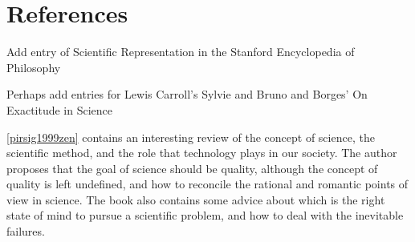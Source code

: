 %
%

\section*{References}

{\color{red} Add entry of Scientific Representation in the Stanford Encyclopedia of Philosophy}

{\color{red} Perhaps add entries for Lewis Carroll's Sylvie and Bruno and Borges' On Exactitude in Science}

\ref{pirsig1999zen} contains an interesting review of the concept of science, the scientific method, and the role that technology plays in our society. The author proposes that the goal of science should be quality, although the concept of quality is left undefined, and how to reconcile the rational and romantic points of view in science. The book also contains some advice about which is the right state of mind to pursue a scientific problem, and how to deal with the inevitable failures.


